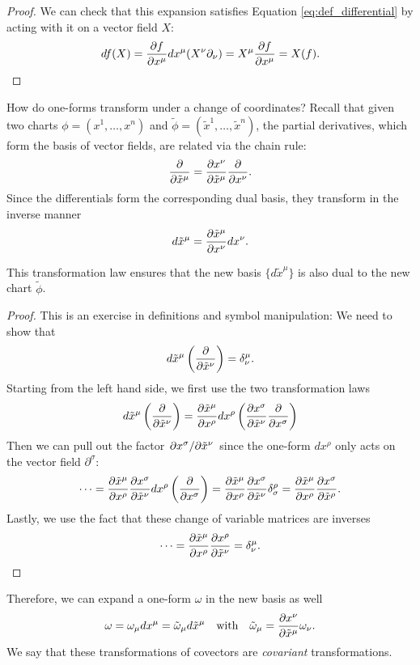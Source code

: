 \begin{proof}
  We can check that this expansion satisfies Equation \eqref{eq:def_differential} by acting with it on a vector field $X$:
  \begin{equation}
    df(X) = \pdv{f}{x^\mu} dx^\mu (X^\nu \partial_\nu) = X^\mu \pdv{f}{x^\mu} = X(f).
  \end{equation}
\end{proof}
How do one-forms transform under a change of coordinates?
Recall that given two charts $\phi = (x^1, \dots, x^n)$ and $\widetilde\phi = (\tilde x^1, \dots, \tilde x^n)$, the partial derivatives, which form the basis of vector fields, are related via the chain rule:
\begin{equation}
  \pdv{}{\tilde x^\mu} = \pdv{x^\nu}{\tilde x^\mu} \pdv{}{x^\nu}.
\end{equation}
Since the differentials form the corresponding dual basis, they transform in the inverse manner
\begin{equation}
  d\tilde x^\mu = \pdv{\tilde x^\mu}{x^\nu} dx^\nu.
\end{equation}
\begin{claim}
  This transformation law ensures that the new basis $\{d \tilde x^\mu\}$ is also dual to the new chart $\widetilde \phi$.
\end{claim}
\begin{proof}
  This is an exercise in definitions and symbol manipulation:
  We need to show that 
  \begin{equation}
    d \tilde x^\mu \left( \pdv{}{\tilde x^\nu} \right) = \delta^\mu_\nu.
  \end{equation}
  Starting from the left hand side, we first use the two transformation laws
  \begin{equation}
    d \tilde x^\mu \left( \pdv{}{\tilde x^\nu} \right) = \pdv{\tilde x^\mu}{x^\rho} dx^\rho \left( \pdv{x^\sigma}{\tilde x^\nu} \pdv{}{x^\sigma} \right)
  \end{equation}
  Then we can pull out the factor $\pdv*{x^\sigma}{\tilde x^\nu}$ since the one-form $dx^\rho$ only acts on the vector field $\partial^\sigma$:
  \begin{equation}
    \dots = \pdv{\tilde x^\mu}{x^\rho} \pdv{x^\sigma}{\tilde x^\nu} dx^\rho \left( \pdv{}{x^\sigma} \right) = \pdv{\tilde x^\mu}{x^\rho} \pdv{x^\sigma}{\tilde x^\nu} \delta^\rho_\sigma = \pdv{\tilde x^\mu}{x^\rho} \pdv{x^\sigma}{\tilde x^\rho}.
  \end{equation}
  Lastly, we use the fact that these change of variable matrices are inverses
  \begin{equation}
    \dots =\pdv{\tilde x^\mu}{x^\rho} \pdv{x^\rho}{\tilde x^\nu} = \delta^\mu_\nu.
  \end{equation}
\end{proof}
Therefore, we can expand a one-form $\omega$ in the new basis as well
\begin{equation}
  \omega = \omega_\mu dx^\mu = \tilde \omega _\mu d\tilde x^\mu \quad \text{with} \quad \tilde \omega_\mu = \pdv{x^\nu}{\tilde x^\mu} \omega_\nu.
\end{equation}
We say that these transformations of covectors are \emph{covariant} transformations.

